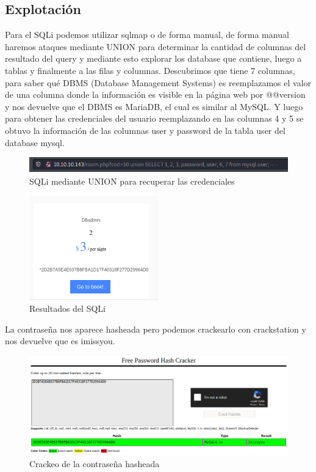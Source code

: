 \documentclass{article}
\begin{document}
\subsection{Explotación}
Para el SQLi podemos utilizar sqlmap o de forma manual, de forma manual haremos ataques mediante UNION para determinar la cantidad de columnas del resultado del query y mediante esto explorar los database que contiene, luego a tablas y finalmente a las filas y columnas.
Descubrimos que tiene 7 columnas, para saber qué DBMS (Database Management Systems) es reemplazamos el valor de una columna donde la información es visible en la página web por @@version y nos devuelve que el DBMS es MariaDB, el cual es similar al MySQL.  Y luego para obtener las credenciales del usuario reemplazando en las columnas 4 y 5 se obtuvo la información de las columnas user y password de la tabla user del database mysql.
\begin{figure}[H]
	\center
	\includegraphics[width=\textwidth]{images/jarvis/6.png}
	\caption{SQLi mediante UNION para recuperar las credenciales}
\end{figure}
\begin{figure}[H]
	\center
	\includegraphics[width=0.5\textwidth]{images/jarvis/7.png}
	\caption{Resultados del SQLi}
\end{figure}

La contraseña nos aparece hasheada pero podemos crackearlo con crackstation y nos devuelve que es imissyou.
\begin{figure}[H]
	\center
	\includegraphics[width=\textwidth]{images/jarvis/8.png}
	\caption{Crackeo de la contraseña hasheada}
\end{figure}
\end{document}
